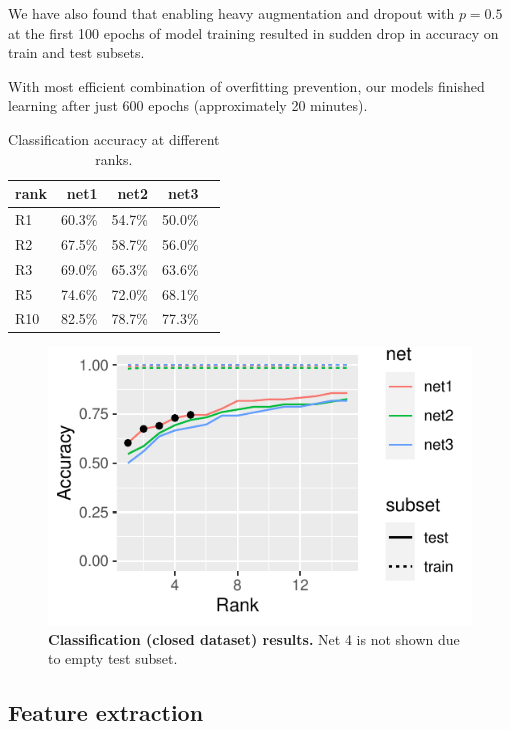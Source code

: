 \documentclass[fleqn,moreauthors,10pt]{ds_report}
\begin{document}
We have also found that enabling heavy augmentation and dropout with $p = 0.5$ at the first 100 epochs of model training resulted in sudden drop in accuracy on train and test subsets.

With most efficient combination of overfitting prevention, our models finished learning after just 600 epochs (approximately 20 minutes).

\begin{table}[hbt]
	\caption{Classification accuracy at different ranks.}
	\centering
	\begin{tabular}{l r r r r}
		\toprule
		rank & net1     & net2     & net3    \\
		\midrule
		R1   & 60.3\%  & 54.7\%  & 50.0\% \\
		R2   & 67.5\%  & 58.7\%  & 56.0\% \\
		R3   & 69.0\%  & 65.3\%  & 63.6\% \\
		R5   & 74.6\%  & 72.0\%  & 68.1\% \\
		R10  & 82.5\%  & 78.7\%  & 77.3\% \\
		\bottomrule
	\end{tabular}
	\label{tab:classification-results}
\end{table}

\begin{figure}[htb]\centering
	\includegraphics[width=0.9\linewidth]{ranks-classification.pdf}
	\caption{\textbf{Classification (closed dataset) results.} Net 4 is not shown due to empty test subset.}
	\label{fig:classification-results}
\end{figure}

\subsection*{Feature extraction}
\end{document}
